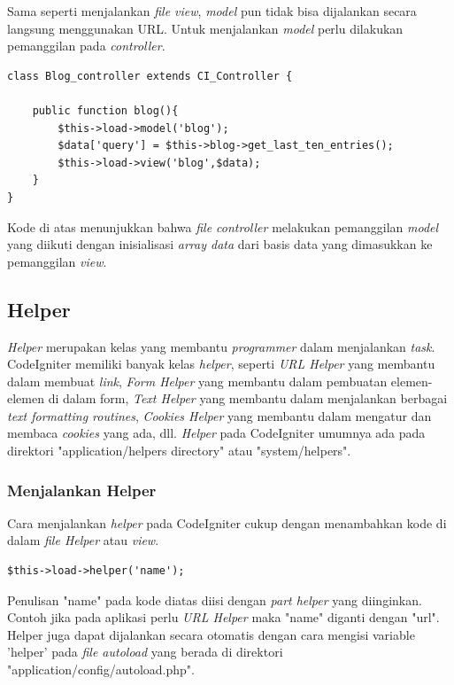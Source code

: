 	Sama seperti menjalankan \textit{file view}, \textit{model} pun tidak bisa dijalankan secara langsung menggunakan URL. Untuk menjalankan \textit{model} perlu dilakukan pemanggilan pada \textit{controller}.
	
	\begin{lstlisting}
class Blog_controller extends CI_Controller {

	public function blog(){
		$this->load->model('blog');
		$data['query'] = $this->blog->get_last_ten_entries();
		$this->load->view('blog',$data);
	}
}
	\end{lstlisting}
	
	Kode di atas menunjukkan bahwa \textit{file controller} melakukan pemanggilan \textit{model} yang diikuti dengan inisialisasi \textit{array data} dari basis data yang dimasukkan ke pemanggilan \textit{view}.
	
	\subsection{Helper}
	\label{sub: helper}
	
	\textit{Helper} merupakan kelas yang membantu \textit{programmer} dalam menjalankan \textit{task}. CodeIgniter memiliki banyak kelas \textit{helper}, seperti \textit{URL Helper} yang membantu dalam membuat \textit{link}, \textit{Form Helper} yang membantu dalam pembuatan elemen-elemen di dalam form, \textit{Text Helper} yang membantu dalam menjalankan berbagai \textit{text formatting routines}, \textit{Cookies Helper} yang membantu dalam mengatur dan membaca \textit{cookies} yang ada, dll. \textit{Helper} pada CodeIgniter umumnya ada pada direktori "application/helpers directory" atau "system/helpers". 
	
	\subsubsection{Menjalankan Helper}
	\label{subsub: menjalnkanHelper}
	
	Cara menjalankan \textit{helper} pada CodeIgniter cukup dengan menambahkan kode di dalam \textit{file Helper} atau \textit{view}.
	
	\begin{lstlisting}
$this->load->helper('name');
	\end{lstlisting}
	
	Penulisan "name" pada kode diatas diisi dengan \textit{part helper} yang diinginkan. Contoh jika pada aplikasi perlu \textit{URL Helper} maka "name" diganti dengan "url". Helper juga dapat dijalankan secara otomatis dengan cara mengisi variable 'helper' pada \textit{file autoload} yang berada di direktori "application/config/autoload.php".
	
